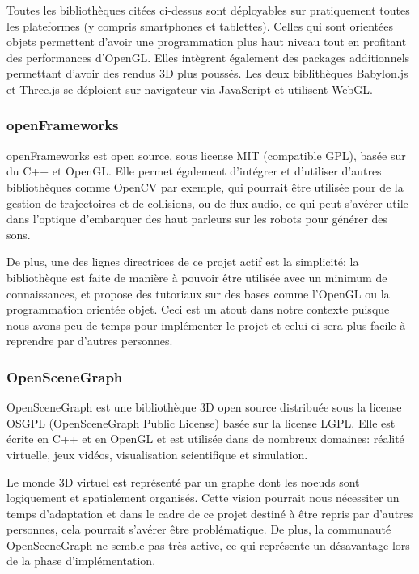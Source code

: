 Toutes les bibliothèques citées ci-dessus sont déployables sur pratiquement toutes les plateformes (y compris smartphones et tablettes). Celles qui sont orientées objets permettent d'avoir une programmation plus haut niveau tout en profitant des performances d'OpenGL. Elles intègrent également des packages additionnels permettant d'avoir des rendus 3D plus poussés. Les deux biblithèques Babylon.js et Three.js se déploient sur navigateur via JavaScript et utilisent WebGL.


\subsubsection{openFrameworks}

openFrameworks est open source, sous license MIT (compatible GPL), basée sur du C++ et OpenGL. Elle permet également d'intégrer et d'utiliser d'autres bibliothèques comme OpenCV par exemple, qui pourrait être utilisée pour de la gestion de trajectoires et de collisions, ou de flux audio, ce qui peut s'avérer utile dans l'optique d'embarquer des haut parleurs sur les robots pour générer des sons. 

De plus, une des lignes directrices de ce projet actif est la simplicité: la bibliothèque est faite de manière à pouvoir être utilisée avec un minimum de connaissances, et propose des tutoriaux sur des bases comme l'OpenGL ou la programmation orientée objet. Ceci est un atout dans notre contexte puisque nous avons peu de temps pour implémenter le projet et celui-ci sera plus facile à reprendre par d'autres personnes.

\subsubsection{OpenSceneGraph}

OpenSceneGraph est une bibliothèque 3D open source distribuée sous la license OSGPL (OpenSceneGraph Public License) basée sur la license LGPL. Elle est écrite en C++ et en OpenGL et est utilisée dans de nombreux domaines: réalité virtuelle, jeux vidéos, visualisation scientifique et simulation. 

Le monde 3D virtuel est représenté par un graphe dont les noeuds sont logiquement et spatialement organisés. Cette vision pourrait nous nécessiter un temps d'adaptation et dans le cadre de ce projet destiné à être repris par d'autres personnes, cela pourrait s'avérer être problématique. De plus, la communauté OpenSceneGraph ne semble pas très active, ce qui représente un désavantage lors de la phase d'implémentation.

